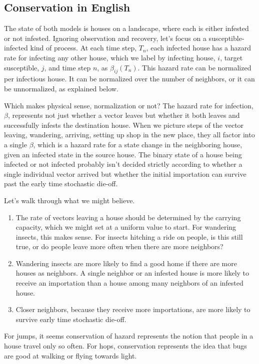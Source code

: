 \documentclass{article}
\begin{document}
\subsection{Conservation in English}
The state of both models is houses on a landscape, where
each is either infested or not infested. Ignoring
observation and recovery, let's focus on a susceptible-infected
kind of process. At each time step, $T_n$, each infected house
has a hazard rate for infecting any other house, which we label
by infecting house, $i$, target susceptible, $j$, and time step
$n$, as $\beta_{ij}(T_n)$. This hazard rate can be normalized per
infectious house. It can be normalized over the number of neighbors,
or it can be unnormalized, as explained below.

Which makes physical sense, normalization or not?
The hazard rate for infection, $\beta$, represents not just whether
a vector leaves but whether it both leaves and successfully infests
the destination house. When we picture steps of the vector leaving,
wandering, arriving, setting up shop in the new place, they
all factor into a single $\beta$, which is a hazard rate for
a state change in the neighboring house, given an infected
state in the source house. The binary state of a house being
infected or not infected probably isn't decided strictly according
to whether a single individual vector arrived but whether
the initial importation can survive past the early time stochastic
die-off.

Let's walk through what we might believe.
\begin{enumerate}
  \item The rate of vectors leaving a house should be determined
        by the carrying capacity, which we might set at a uniform
        value to start. For wandering insects, this makes sense.
        For insects hitching a ride on people, is this still true,
        or do people leave more often when there are more neighbors?
  \item Wandering insects are more likely to find a good home if there
        are more houses as neighbors. A single neighbor or an infested
        house is more likely to receive an importation than a house
        among many neighbors of an infested house.
  \item Closer neighbors, because they receive more importations,
        are more likely to survive early time stochastic die-off.
\end{enumerate}
For jumps, it seems conservation of hazard represents the notion
that people in a house travel only so often. For hops, conservation
represents the idea that bugs are good at walking or flying towards
light.
\end{document}
